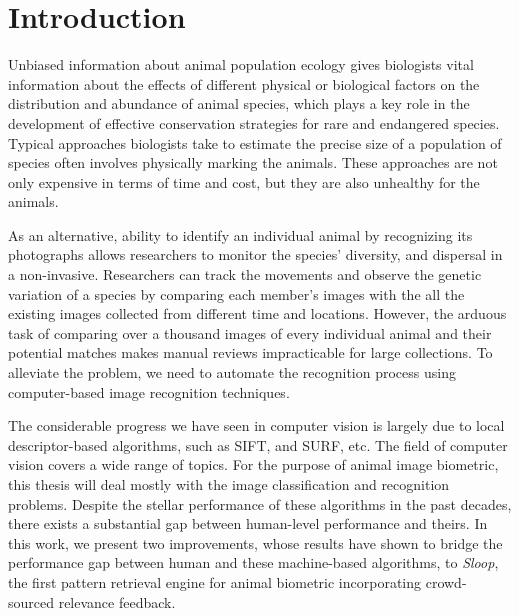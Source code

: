 
\chapter{Introduction}

Unbiased information about animal population ecology gives biologists vital
information about the effects of different physical or biological factors on
the distribution and abundance of animal species, which plays a key role in the
development of effective conservation strategies for rare and endangered
species. Typical approaches biologists take to estimate the precise size of a
population of species often involves physically marking the animals. These
approaches are not only expensive in terms of time and cost, but they are also
unhealthy for the animals.

As an alternative, ability to identify an individual animal by recognizing its
photographs allows researchers to monitor the species' diversity, and dispersal
in a non-invasive. Researchers can track the movements and observe the genetic
variation of a species by comparing each member's images with the all the
existing images collected from different time and locations. However, the
arduous task of comparing over a thousand images of every individual animal and
their potential matches makes manual reviews impracticable for large
collections. To alleviate the problem, we need to automate the recognition
process using computer-based image recognition techniques.

The considerable progress we have seen in computer vision is largely due to
local descriptor-based algorithms, such as SIFT\cite{lowe04}, and
SURF\cite{surf08}, etc. The field of computer vision covers a wide range of
topics. For the purpose of animal image biometric, this thesis will deal mostly
with the image classification and recognition problems. Despite the stellar
performance of these algorithms in the past decades, there exists a substantial
gap between human-level performance and theirs. In this work, we present two
improvements, whose results have shown to bridge the performance gap between
human and these machine-based algorithms, to \emph{Sloop}, the first pattern
retrieval engine for animal biometric incorporating crowd-sourced relevance
feedback.

